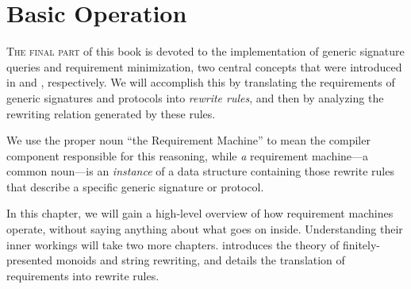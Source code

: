 \documentclass[../generics]{subfiles}
\begin{document}
\chapter{Basic Operation}\label{chap:basic operation}

\lettrine{T}{he final part} of this book is devoted to the implementation of generic signature queries and requirement minimization, two central concepts that were introduced in  and , respectively. We will accomplish this by translating the requirements of generic signatures and protocols into \emph{rewrite rules}, and then by analyzing the rewriting relation generated by these rules.

We use the proper noun ``the Requirement Machine'' to mean the compiler component responsible for this reasoning, while \emph{a} requirement machine---a common noun---is an \emph{instance} of a data structure containing those rewrite rules that describe a specific generic signature or protocol.

In this chapter, we will gain a high-level overview of how requirement machines operate, without saying anything about what goes on inside. Understanding their inner workings will take two more chapters.  introduces the theory of finitely-presented monoids and string rewriting, and  details the translation of requirements into rewrite rules.

\smallskip
\end{document}
